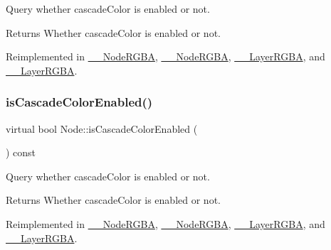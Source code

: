 Query whether cascade\+Color is enabled or not. \begin{DoxyReturn}{Returns}
Whether cascade\+Color is enabled or not. 
\end{DoxyReturn}


Reimplemented in \hyperlink{class____NodeRGBA_a24f2ae00f1994d6601ce8e1f089dafe1}{\+\_\+\+\_\+\+Node\+R\+G\+BA}, \hyperlink{class____NodeRGBA_a24f2ae00f1994d6601ce8e1f089dafe1}{\+\_\+\+\_\+\+Node\+R\+G\+BA}, \hyperlink{class____LayerRGBA_abc02efad9eb89df47e6a0365dc9c784e}{\+\_\+\+\_\+\+Layer\+R\+G\+BA}, and \hyperlink{class____LayerRGBA_abc02efad9eb89df47e6a0365dc9c784e}{\+\_\+\+\_\+\+Layer\+R\+G\+BA}.

\mbox{\label{classNode_a4ade1991e3cff2c032d50fc7f7392764}} 
\subsubsection{\texorpdfstring{is\+Cascade\+Color\+Enabled()}{isCascadeColorEnabled()}\hspace{0.1cm}{\footnotesize\ttfamily [2/2]}}
{\footnotesize\ttfamily virtual bool Node\+::is\+Cascade\+Color\+Enabled (\begin{DoxyParamCaption}{ }\end{DoxyParamCaption}) const\hspace{0.3cm}{\ttfamily [virtual]}}

Query whether cascade\+Color is enabled or not. \begin{DoxyReturn}{Returns}
Whether cascade\+Color is enabled or not. 
\end{DoxyReturn}


Reimplemented in \hyperlink{class____NodeRGBA_a24f2ae00f1994d6601ce8e1f089dafe1}{\+\_\+\+\_\+\+Node\+R\+G\+BA}, \hyperlink{class____NodeRGBA_a24f2ae00f1994d6601ce8e1f089dafe1}{\+\_\+\+\_\+\+Node\+R\+G\+BA}, \hyperlink{class____LayerRGBA_abc02efad9eb89df47e6a0365dc9c784e}{\+\_\+\+\_\+\+Layer\+R\+G\+BA}, and \hyperlink{class____LayerRGBA_abc02efad9eb89df47e6a0365dc9c784e}{\+\_\+\+\_\+\+Layer\+R\+G\+BA}.

\mbox{\label{classNode_a79f5da3b20b08356467db7ce95cf9f54}} 
